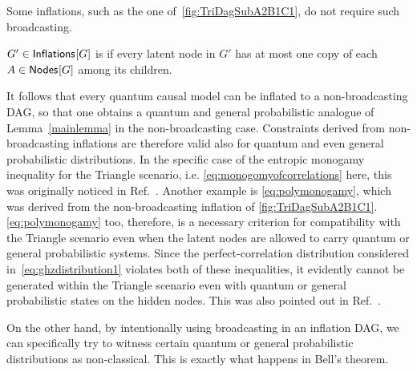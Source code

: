 Some inflations, such as the one of~\cref{fig:TriDagSubA2B1C1}, do not require such broadcasting.

\begin{definition}
	$G'\in{\operatorname{\mathsf{Inflations}}_{}}\lbrack G\rbrack$ is  if every latent node in $G'$ has at most one copy of each $A\in{\operatorname{\mathsf{Nodes}}_{}}\lbrack G\rbrack$ among its children.
\end{definition}

It follows that every quantum causal model can be inflated to a non-broadcasting DAG, so that one obtains a quantum and general probabilistic analogue of Lemma~\ref{mainlemma} in the non-broadcasting case. Constraints derived from non-broadcasting inflations are therefore valid also for quantum and even general probabilistic distributions. In the specific case of the entropic monogamy inequality for the Triangle scenario, i.e. \cref{eq:monogomyofcorrelations} here, this was originally noticed in Ref.~\cite{pusey2014gdag}. Another example is \cref{eq:polymonogamy}, which was derived from the non-broadcasting inflation of \cref{fig:TriDagSubA2B1C1}. \cref{eq:polymonogamy} too, therefore, is a necessary criterion for compatibility with the Triangle scenario even when the latent nodes are allowed to carry quantum or general probabilistic systems.
Since the perfect-correlation distribution considered in~\cref{eq:ghzdistribution1} violates both of these inequalities, it evidently cannot be generated within the Triangle scenario even with quantum or general probabilistic states on the hidden nodes. This was also pointed out in Ref.~\cite{pusey2014gdag}.


On the other hand, by intentionally using broadcasting in an inflation DAG, we can specifically try to witness certain quantum or general probabilistic distributions as non-classical. This is exactly what happens in Bell's theorem.


